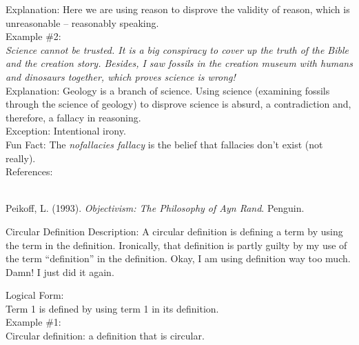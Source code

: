 \documentclass[a4paper,12pt,single,pdftex]{scrartcl}
\begin{document}
      
        Explanation: Here we are using reason to disprove the validity of reason, which is unreasonable -- reasonably speaking.
      \\

      
        Example \#2:
      \\

      
        {\em Science cannot be trusted.  It is a big conspiracy to cover up the truth of the Bible and the creation story.  Besides, I saw fossils in the creation museum with humans and dinosaurs together, which proves science is wrong!}
      \\

      
        Explanation: Geology is a branch of science.  Using science (examining fossils through the science of geology) to disprove science is absurd, a contradiction and, therefore, a fallacy in reasoning.
      \\

      
        Exception: Intentional irony.
      \\

      
        Fun Fact: The {\em nofallacies fallacy} is the belief that fallacies don't exist (not really).
      \\

    
    References:

    
      
        
      \\

      
        
          Peikoff, L. (1993). {\it Objectivism: The Philosophy of Ayn Rand}. Penguin.
        
      
    
  

Circular Definition
    Description: A circular definition is defining a term by using the term in the definition.  Ironically, that definition is partly guilty by my use of the term “definition” in the definition.  Okay, I am using definition way too much. Damn!  I just did it again.

    
      Logical Form:
    \\

    
      Term 1 is defined by using term 1 in its definition.
    \\

    
      Example \#1:
    \\

    
       Circular definition: a definition that is circular.
    \\
\end{document}
